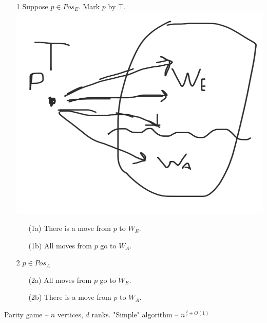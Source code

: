 \begin{itemize}
	\item[1] Suppose $p \in Pos_E$. Mark $p$ by $\top$.\\
	\includegraphics[scale=0.1]{content/graphics/game5}
	\begin{itemize}
		\item[(1a)] There is a move from $p$ to $W_E$.
		\item[(1b)] All moves from $p$ go to $W_A$.
	\end{itemize}
	\item[2] $p \in Pos_A$
	\begin{itemize}
		\item[(2a)] All moves from $p$ go to $W_E$.
		\item[(2b)] There is a move from $p$ to $W_A$.
	\end{itemize}
\end{itemize}

\noindent
Parity game -- $n$ vertices, $d$ ranks. "Simple" algorithm -- $n^{\frac{d}{2} + \Theta(1)}$
